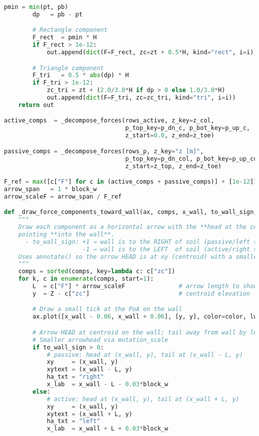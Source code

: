 \begin{lstlisting}[language=Python]
        pmin = min(pt, pb)
        dp   = pb - pt

        # Rectangle component
        F_rect  = pmin * H
        if F_rect > 1e-12:
            out.append(dict(F=F_rect, zc=zt + 0.5*H, kind="rect", i=i))

        # Triangle component
        F_tri   = 0.5 * abs(dp) * H
        if F_tri > 1e-12:
            zc_tri = zt + (2.0/3.0*H if dp > 0 else 1.0/3.0*H)
            out.append(dict(F=F_tri, zc=zc_tri, kind="tri", i=i))
    return out

active_comps  = _decompose_forces(rows_active, z_key=z_col,
                                  p_top_key=p_dn_c, p_bot_key=p_up_c,
                                  z_start=0.0, z_end=z_toe)

passive_comps = _decompose_forces(rows_p, z_key="z [m]",
                                  p_top_key=p_dn_col, p_bot_key=p_up_col,
                                  z_start=z_top, z_end=z_toe)

F_ref = max([c["F"] for c in (active_comps + passive_comps)] + [1e-12])
arrow_span   = 1 * block_w
arrow_scaleF = arrow_span / F_ref

def _draw_force_components_toward_wall(ax, comps, x_wall, to_wall_sign, color, prefix):
    """
    Draw each component as a horizontal arrow with the **head at the centroid** (point of action),
    pointing **into the wall**.
      - to_wall_sign: +1 → wall is to the RIGHT of soil (passive/left side)  → arrow points +x
                      -1 → wall is to the LEFT  of soil (active/right side)  → arrow points -x
    Uses annotate() so the arrow HEAD is at xy (centroid) with a smaller head.
    """
    comps = sorted(comps, key=lambda c: c["zc"])
    for k, c in enumerate(comps, start=1):
        L  = c["F"] * arrow_scaleF               # arrow length to show magnitude
        y  = Z - c["zc"]                         # centroid elevation

        # Draw a small tick at the PoA on the wall
        ax.plot([x_wall - 0.06, x_wall + 0.06], [y, y], color=color, lw=1.4)

        # Arrow HEAD at centroid on the wall; tail away from wall by length L
        # Smaller arrowhead via mutation_scale
        if to_wall_sign > 0:
            # passive: head at (x_wall, y), tail at (x_wall - L, y)
            xy     = (x_wall, y)
            xytext = (x_wall - L, y)
            ha_txt = "right"
            x_lab  = x_wall - L - 0.03*block_w
        else:
            # active: head at (x_wall, y), tail at (x_wall + L, y)
            xy     = (x_wall, y)
            xytext = (x_wall + L, y)
            ha_txt = "left"
            x_lab  = x_wall + L + 0.03*block_w


\end{lstlisting}
